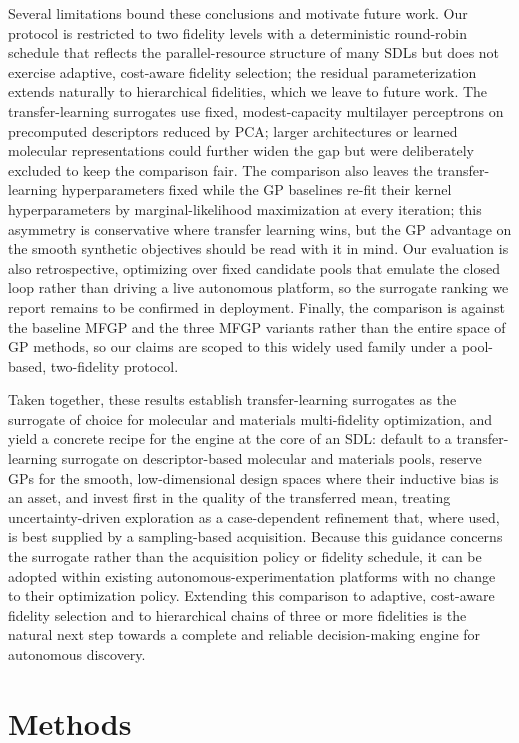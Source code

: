 \documentclass[11pt,a4paper]{article}%
\begin{document}
Several limitations bound these conclusions and motivate future work. Our protocol is
restricted to two fidelity levels with a deterministic round-robin schedule that reflects
the parallel-resource structure of many SDLs but does not exercise adaptive, cost-aware
fidelity selection; the residual parameterization extends naturally to hierarchical
fidelities, which we leave to future work. The transfer-learning surrogates use fixed, modest-capacity
multilayer perceptrons on precomputed descriptors reduced by PCA;
larger architectures or learned molecular representations could further widen the gap but
were deliberately excluded to keep the comparison fair. The comparison also leaves the
transfer-learning hyperparameters fixed while the GP baselines re-fit their kernel
hyperparameters by marginal-likelihood maximization at every iteration; this asymmetry
is conservative where transfer learning wins, but the GP advantage on the smooth
synthetic objectives should be read with it in mind. Our evaluation is also retrospective,
optimizing over fixed candidate pools that emulate the closed loop rather than driving a live
autonomous platform, so the surrogate ranking we report remains to be confirmed in
deployment. Finally, the comparison is against
the baseline MFGP and the three MFGP variants rather than the entire space
of GP methods, so our claims are scoped to this widely used family under a
pool-based, two-fidelity protocol.

Taken together, these results establish transfer-learning surrogates as the surrogate
of choice for molecular and materials multi-fidelity optimization, and yield a concrete
recipe for the engine at the core of an SDL: default to a transfer-learning surrogate on descriptor-based
molecular and materials pools, reserve GPs for the smooth, low-dimensional
design spaces where their inductive bias is an asset, and invest first in the quality of the
transferred mean, treating uncertainty-driven exploration as a case-dependent refinement
that, where used, is best supplied by a sampling-based acquisition. Because this guidance
concerns the surrogate rather than the acquisition policy or fidelity schedule, it can be
adopted within existing autonomous-experimentation platforms with no change to their
optimization policy. Extending this comparison to adaptive, cost-aware fidelity selection
and to hierarchical chains of three or more fidelities is the natural next step towards a
complete and reliable decision-making engine for autonomous discovery.


\section{Methods}\label{sec:methods}
\end{document}
